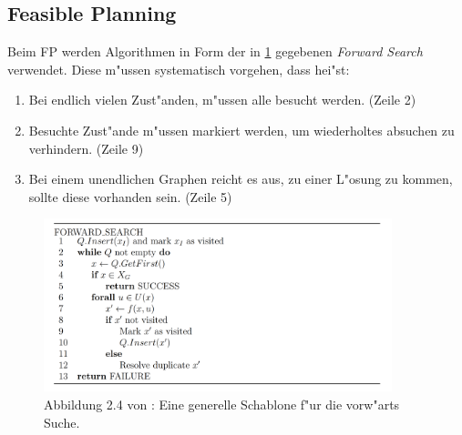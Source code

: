 

%

\subsection {Feasible Planning} %
Beim FP werden Algorithmen in Form der in \ref{lav04} gegebenen \textit{Forward Search} verwendet. Diese m"ussen systematisch vorgehen, dass hei"st:
\begin{enumerate}
	\item Bei endlich vielen Zust"anden, m"ussen alle besucht werden. (Zeile 2)
	\item Besuchte Zust"ande m"ussen markiert werden, um wiederholtes absuchen zu verhindern. (Zeile 9)
	\item Bei einem unendlichen Graphen reicht es aus, zu einer L"osung zu kommen, sollte diese vorhanden sein. (Zeile 5)
\end{enumerate} \cite[~S. 32]{Lav06}
\begin{figure}
	\centering
	\includegraphics[width=0.9\textwidth]{images/img225.png}
	\caption{Abbildung 2.4 von \cite[~S. 33]{Lav06}:  Eine generelle Schablone f"ur die vorw"arts Suche.}
	\label{lav04}
\end{figure} 

